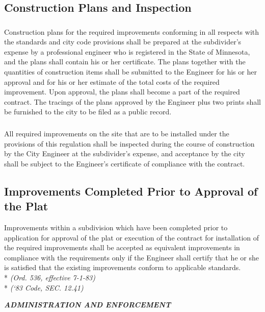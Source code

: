 \subsection{Construction Plans and Inspection}
\subsubsection{}
Construction plans for the required improvements conforming in all respects with the standards and city code provisions shall be prepared at the subdivider’s expense by a professional engineer who is registered in the State of Minnesota, and the plans shall contain his or her certificate. The plans together with the quantities of construction items shall be submitted to the Engineer for his or her approval and for his or her estimate of the total costs of the required improvement. Upon approval, the plans shall become a part of the required contract. The tracings of the plans approved by the Engineer plus two prints shall be furnished to the city to be filed as a public record.
\subsubsection{}
All required improvements on the site that are to be installed under the provisions of this regulation shall be inspected during the course of construction by the City Engineer at the subdivider’s expense, and acceptance by the city shall be subject to the Engineer’s certificate of compliance with the contract.
\subsection{Improvements Completed Prior to Approval of the Plat}
Improvements within a subdivision which have been completed prior to application for approval of the plat or execution of the contract for installation of the required improvements shall be accepted as equivalent improvements in compliance with the requirements only if the Engineer shall certify that he or she is satisfied that the existing improvements conform to applicable standards.\\*
\emph{(Ord. 536, effective 7-1-83)}\\*
\emph{(‘83 Code, SEC. 12.41)}

\begin{center}
    \emph{\textbf{\LARGE{ADMINISTRATION AND ENFORCEMENT}}}
\end{center}

\setcounter{section}{64}

